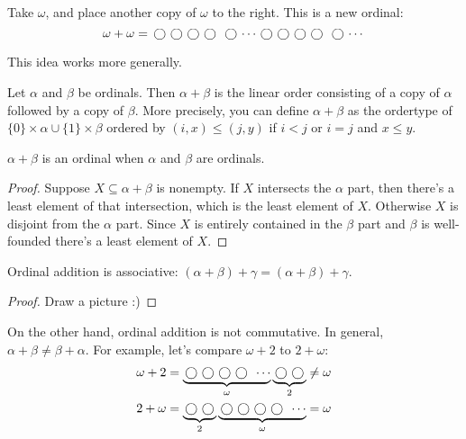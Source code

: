\documentclass[10pt]{amsart}
\begin{document}
\begin{example}
Take $\omega$, and place another copy of $\omega$ to the right. This is a new ordinal:
\[
\omega + \omega = \mathord{\,\bigcirc\,} \mathord{\,\bigcirc\,} \mathord{\,\bigcirc\,} \mathord{\,\bigcirc\,} \ \mathord{\,\bigcirc\,} \cdots \mathord{\,\bigcirc\,} \mathord{\,\bigcirc\,} \mathord{\,\bigcirc\,} \mathord{\,\bigcirc\,} \ \mathord{\,\bigcirc\,} \cdots
\]
\end{example}

This idea works more generally.

\begin{definition}
Let $\alpha$ and $\beta$ be ordinals. Then $\alpha + \beta$ is the linear order consisting of a copy of $\alpha$ followed by a copy of $\beta$. More precisely, you can define $\alpha + \beta$ as the ordertype of $\{0\} \times \alpha \cup \{1\} \times \beta$ ordered by $(i,x) \le (j,y)$ if $i < j$ or $i = j$ and $x \le y$.
\end{definition}

\begin{proposition}
$\alpha + \beta$ is an ordinal when $\alpha$ and $\beta$ are ordinals.
\end{proposition}

\begin{proof}
Suppose $X \subseteq \alpha + \beta$ is nonempty. If $X$ intersects the $\alpha$ part, then there's a least element of that intersection, which is the least element of $X$. Otherwise $X$ is disjoint from the $\alpha$ part. Since $X$ is entirely contained in the $\beta$ part and $\beta$ is well-founded there's a least element of $X$.
\end{proof}

\begin{proposition}
Ordinal addition is associative: $(\alpha + \beta) + \gamma = (\alpha + \beta) + \gamma$.
\end{proposition}

\begin{proof}
Draw a picture :)
\end{proof}

On the other hand, ordinal addition is not commutative. In general, $\alpha + \beta \ne \beta + \alpha$. For example, let's compare $\omega + 2$ to $2 + \omega$:
\begin{align*}
\omega + 2 &= \underbrace{\mycirc \mycirc \mycirc \mycirc \ \cdots}_{\omega} \underbrace{\mycirc \mycirc}_2 \ne \omega\\
2 + \omega &= \underbrace{\mycirc \mycirc}_2 \underbrace{\mycirc \mycirc \mycirc \mycirc \ \cdots}_\omega = \omega
\end{align*}
\end{document}
